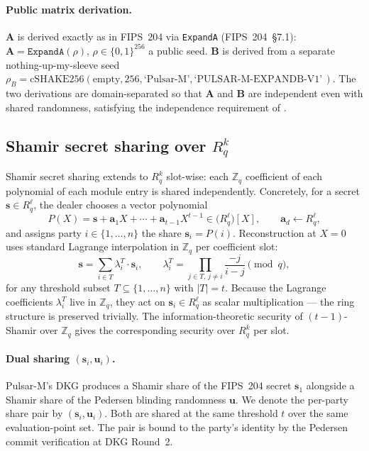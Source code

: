\documentclass[11pt,a4paper]{article}
\theoremstyle{definition}
\theoremstyle{remark}
\newcommand{\Rq}{R_q}
\newcommand{\Zq}{\mathbb{Z}_q}
\newcommand{\cSHAKE}{\mathrm{cSHAKE256}}
\begin{document}
\paragraph{Public matrix derivation.}
$\mathbf{A}$ is derived exactly as in FIPS~204 via
\texttt{ExpandA} (FIPS~204~\S7.1): \(\mathbf{A} = \texttt{ExpandA}(\rho)\),
$\rho \in \{0,1\}^{256}$ a public seed. $\mathbf{B}$ is derived from
a separate nothing-up-my-sleeve seed
$\rho_B = \cSHAKE(\text{empty}, 256, \text{`Pulsar-M'},
\text{`PULSAR-M-EXPANDB-V1'}\,)$. The two derivations are
domain-separated so that $\mathbf{A}$ and $\mathbf{B}$ are independent
even with shared randomness, satisfying the independence
requirement of .

\subsection{Shamir secret sharing over $\Rq^k$}
\label{sec:prelim-shamir}

Shamir secret sharing extends to $\Rq^k$ slot-wise: each $\Zq$
coefficient of each polynomial of each module entry is shared
independently. Concretely, for a secret $\mathbf{s} \in \Rq^\ell$,
the dealer chooses a vector polynomial
\[
P(X) = \mathbf{s} + \mathbf{a}_1 X + \cdots + \mathbf{a}_{t-1} X^{t-1}
\in \bigl(\Rq^\ell\bigr)[X], \qquad \mathbf{a}_d \gets \Rq^\ell,
\]
and assigns party $i \in \{1, \dots, n\}$ the share $\mathbf{s}_i = P(i)$.
Reconstruction at $X = 0$ uses standard Lagrange interpolation in
$\Zq$ per coefficient slot:
\[
\mathbf{s} = \sum_{i \in T} \lambda_i^T \cdot \mathbf{s}_i, \qquad
\lambda_i^T = \prod_{j \in T,\, j \ne i} \frac{-j}{i - j} \pmod q,
\]
for any threshold subset $T \subseteq \{1, \dots, n\}$ with
$|T| = t$. Because the Lagrange coefficients $\lambda_i^T$ live in
$\Zq$, they act on $\mathbf{s}_i \in \Rq^\ell$ as scalar
multiplication --- the ring structure is preserved trivially. The
information-theoretic security of $(t-1)$-Shamir over $\Zq$ gives
the corresponding security over $\Rq^k$ per slot.

\paragraph{Dual sharing $(\mathbf{s}_i, \mathbf{u}_i)$.}
Pulsar-M's DKG produces a Shamir share of the FIPS~204 secret
$\mathbf{s}_1$ alongside a Shamir share of the Pedersen blinding
randomness $\mathbf{u}$. We denote the per-party share pair by
$(\mathbf{s}_i, \mathbf{u}_i)$. Both are shared at the same threshold
$t$ over the same evaluation-point set. The pair is bound to the
party's identity by the Pedersen commit verification at DKG Round~2.
\end{document}
